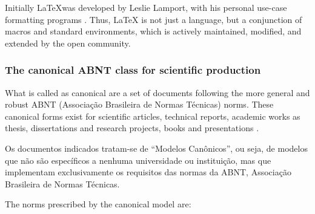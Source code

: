 \documentclass[
12pt,				%
openright,			%
oneside,			%
a4paper,			%
brazil,				%
english,			%
]{abntex2}
\begin{document}
Initially \LaTeX was developed by Leslie Lamport, with his personal
use-case formatting programs \cite{lamport1994}. Thus, \LaTeX{} is not
just a language, but a conjunction of macros and standard
environments, which is actively maintained, modified, and extended by
the open community.

\subsubsection{The canonical ABNT class for scientific production}

What is called as canonical are a set of documents following the more
general and robust ABNT (Associação Brasileira de Normas Técnicas)
norms. These canonical forms exist for scientific articles, technical
reports, academic works as thesis, dissertations and research
projects, books and presentations \cite{abntex2012}. 

\begin{citacao}
  Os documentos indicados tratam-se de “Modelos Canônicos”, ou seja,
  de modelos que não são específicos a nenhuma universidade ou instituição, mas
  que implementam exclusivamente os requisitos das normas da ABNT, Associação
  Brasileira de Normas Técnicas. \cite[Cap. 1]{araujoclasse}
\end{citacao}


The norms prescribed by the canonical model are:
\end{document}
